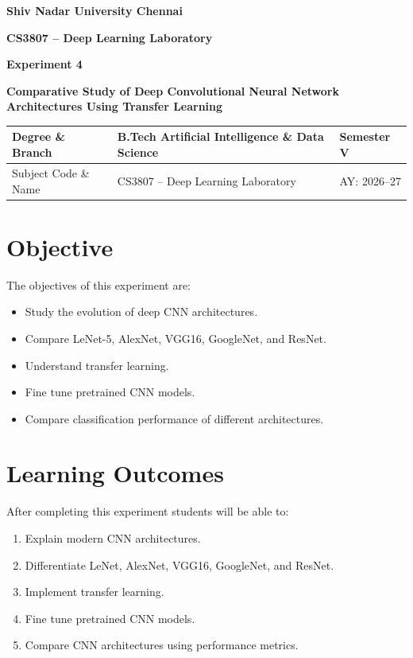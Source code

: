 \documentclass[11pt]{article}
\begin{document}
\begin{center}
\Large\textbf{Shiv Nadar University Chennai}\\
\end{center}

\begin{center}
\textbf{CS3807 – Deep Learning Laboratory}
\vspace{2mm}

\textbf{Experiment 4}
\vspace{2mm}

\textbf{Comparative Study of Deep Convolutional Neural Network Architectures Using Transfer Learning}
\end{center}

\renewcommand{\arraystretch}{1.4}

\begin{tabular}{|p{3.5cm}|p{8cm}|p{2cm}|}
\hline
Degree \& Branch & B.Tech Artificial Intelligence \& Data Science & Semester V\\ \hline
Subject Code \& Name & CS3807 -- Deep Learning Laboratory & AY: 2026--27\\ \hline
\end{tabular}
\vspace{3mm}

\section{Objective}
The objectives of this experiment are:
\begin{itemize}[leftmargin=*]
    \item Study the evolution of deep CNN architectures.
    \item Compare LeNet-5, AlexNet, VGG16, GoogleNet, and ResNet.
    \item Understand transfer learning.
    \item Fine tune pretrained CNN models.
    \item Compare classification performance of different architectures.
\end{itemize}

\section{Learning Outcomes}
After completing this experiment students will be able to:
\begin{enumerate}[leftmargin=*]
    \item Explain modern CNN architectures.
    \item Differentiate LeNet, AlexNet, VGG16, GoogleNet, and ResNet.
    \item Implement transfer learning.
    \item Fine tune pretrained CNN models.
    \item Compare CNN architectures using performance metrics.
\end{enumerate}
\end{document}

